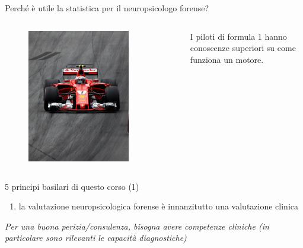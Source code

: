 \documentclass[
  ignorenonframetext,
]{beamer}
\providecommand{\tightlist}{%
  \setlength{\itemsep}{0pt}\setlength{\parskip}{0pt}}
\begin{document}
\begin{frame}{Perché è utile la statistica per il neuropsicologo
forense?}
\begin{columns}
\begin{figure}
\includegraphics[width=0.8\textwidth]{Figures/F1.png}
\end{figure}
\tiny{I piloti di formula 1 hanno conoscenze superiori su come funziona un motore.}

\end{columns}
\end{frame}

\begin{frame}{5 principi basilari di questo corso (1)}
\label{principi-basilari-di-questo-corso-1}
\begin{enumerate}
\tightlist
\item
  la valutazione neuropsicologica forense è innanzitutto una valutazione
  clinica
\end{enumerate}

\vspace{3em}

\emph{Per una buona perizia/consulenza, bisogna avere competenze
cliniche (in particolare sono rilevanti le capacità diagnostiche)}
\end{frame}
\end{document}
